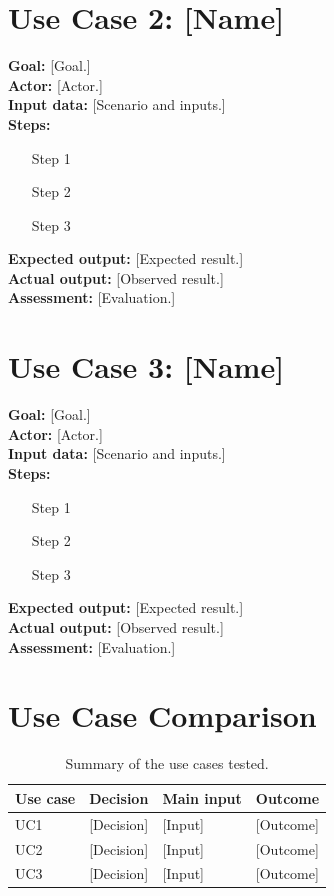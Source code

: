 \documentclass[12pt,a4paper]{report}
\begin{document}
\section{Use Case 2: [Name]}
\textbf{Goal:} [Goal.]\\
\textbf{Actor:} [Actor.]\\
\textbf{Input data:} [Scenario and inputs.]\\
\textbf{Steps:}
\begin{enumerate}
  \item [Step 1]
  \item [Step 2]
  \item [Step 3]
\end{enumerate}
\textbf{Expected output:} [Expected result.]\\
\textbf{Actual output:} [Observed result.]\\
\textbf{Assessment:} [Evaluation.]

\section{Use Case 3: [Name]}
\textbf{Goal:} [Goal.]\\
\textbf{Actor:} [Actor.]\\
\textbf{Input data:} [Scenario and inputs.]\\
\textbf{Steps:}
\begin{enumerate}
  \item [Step 1]
  \item [Step 2]
  \item [Step 3]
\end{enumerate}
\textbf{Expected output:} [Expected result.]\\
\textbf{Actual output:} [Observed result.]\\
\textbf{Assessment:} [Evaluation.]

\section{Use Case Comparison}
\begin{table}[H]
\centering
\caption{Summary of the use cases tested.}
\label{tab:usecases}
\begin{tabularx}{\textwidth}{p{1.5cm} p{2.5cm} X X}
\toprule
\textbf{Use case} & \textbf{Decision} & \textbf{Main input} & \textbf{Outcome}\\
\midrule
UC1 & [Decision] & [Input] & [Outcome]\\
UC2 & [Decision] & [Input] & [Outcome]\\
UC3 & [Decision] & [Input] & [Outcome]\\
\bottomrule
\end{tabularx}
\end{table}
\end{document}
